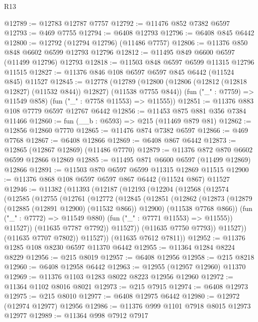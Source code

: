 \begin{lexlean}{R13}
\begin{coremodule}
@12789 := @12783 @12787 @7757
@12792 := @11476 @852 @7382 @6597
@12793 := @469 @7755
@12794 := @6408 @12793
@12796 := @6408 @845 @6442
@12800 := @12792 (@12794 @12796) (@11486 @7757)
@12806 := @11376 @850 @848 @6602 @6599 @12793 @12796
@12812 := @11495 @849 @6600 @6597 (@11499 @12796) @12793
@12818 := @11503 @848 @6597 @6599 @11315 @12796 @11515
@12827 := @11376 @846 @108 @6597 @6597 @845 @6442 (@11524 @845) @11527
@12845 := @12778
    (@12789
      (@12800 (@12806 (@12812 (@12818 @12827) (@11532 @844)) @12827) (@11538 @7755 @844))
      (fun ("_" : @7759) => @11549 @858)
      (fun ("_" : @7758 @11553) => @11555))
@12851 := @11376 @883 @108 @7779 @6597 @12767 @6442
@12856 := @11453 @875 @881 @356 @7384 @11466
@12860 := fun (__b : @6593) => @215 (@11469 @879 @81)
@12862 := @12856 @12860 @7770
@12865 := @11476 @874 @7382 @6597
@12866 := @469 @7768
@12867 := @6408 @12866
@12869 := @6408 @867 @6442
@12873 := @12865 (@12867 @12869) (@11486 @7770)
@12879 := @11376 @872 @870 @6602 @6599 @12866 @12869
@12885 := @11495 @871 @6600 @6597 (@11499 @12869) @12866
@12891 := @11503 @870 @6597 @6599 @11315 @12869 @11515
@12900 := @11376 @868 @108 @6597 @6597 @867 @6442 (@11524 @867) @11527
@12946 := @11382
    (@11393
      (@12187
        (@12193
          (@12204
            (@12568
              (@12574
                (@12585
                  (@12755
                    (@12761
                      (@12772
                        (@12845
                          (@12851
                            (@12862
                              (@12873
                                (@12879 (@12885 (@12891 @12900) (@11532 @866)) @12900)
                                (@11538 @7768 @866))
                              (fun ("_" : @7772) => @11549 @880)
                              (fun ("_" : @7771 @11553) => @11555))
                            @11527))
                        (@11635 @7787 @7792))
                      @11527))
                  (@11635 @7750 @7793))
                @11527))
            (@11635 @7707 @7802))
          @11527))
      (@11635 @7612 @7811))
@12952 := @11376 @1285 @108 @8230 @6597 @11370 @6442
@12955 := @11364 @1284 @8224 @8229
@12956 := @215 @8019
@12957 := @6408 @12956
@12958 := @215 @8218
@12960 := @6408 @12958 @6442
@12963 := @12955 (@12957 @12960) @11370
@12969 := @11376 @1103 @1283 @8022 @8223 @12956 @12960
@12972 := @11364 @1102 @8016 @8021
@12973 := @215 @7915
@12974 := @6408 @12973
@12975 := @215 @8010
@12977 := @6408 @12975 @6442
@12980 := @12972 (@12974 @12977) @12956
@12986 := @11376 @999 @1101 @7918 @8015 @12973 @12977
@12989 := @11364 @998 @7912 @7917

\end{coremodule}
\end{lexlean}
